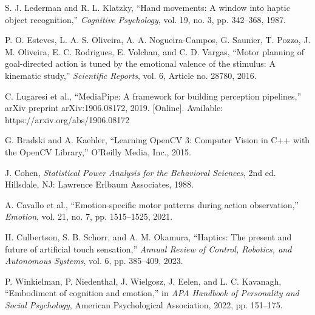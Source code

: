 \documentclass[conference]{IEEEtran}
\begin{document}
\begin{thebibliography}{00}

S. J. Lederman and R. L. Klatzky, 
``Hand movements: A window into haptic object recognition,'' 
\textit{Cognitive Psychology}, vol. 19, no. 3, pp. 342--368, 1987.

P. O. Esteves, L. A. S. Oliveira, A. A. Nogueira-Campos, G. Saunier, T. Pozzo, J. M. Oliveira, E. C. Rodrigues, E. Volchan, and C. D. Vargas, 
``Motor planning of goal-directed action is tuned by the emotional valence of the stimulus: A kinematic study,'' 
\textit{Scientific Reports}, vol. 6, Article no. 28780, 2016.

C. Lugaresi et al., 
``MediaPipe: A framework for building perception pipelines,'' 
arXiv preprint arXiv:1906.08172, 2019. 
[Online]. Available: https://arxiv.org/abs/1906.08172

G. Bradski and A. Kaehler,
``Learning OpenCV 3: Computer Vision in C++ with the OpenCV Library,''
O'Reilly Media, Inc., 2015.

J. Cohen,
\textit{Statistical Power Analysis for the Behavioral Sciences}, 2nd ed.
Hillsdale, NJ: Lawrence Erlbaum Associates, 1988.

A. Cavallo et al.,
``Emotion-specific motor patterns during action observation,''
\textit{Emotion}, vol. 21, no. 7, pp. 1515--1525, 2021.

H. Culbertson, S. B. Schorr, and A. M. Okamura,
``Haptics: The present and future of artificial touch sensation,''
\textit{Annual Review of Control, Robotics, and Autonomous Systems}, vol. 6, pp. 385--409, 2023.

P. Winkielman, P. Niedenthal, J. Wielgosz, J. Eelen, and L. C. Kavanagh,
``Embodiment of cognition and emotion,''
in \textit{APA Handbook of Personality and Social Psychology}, 
American Psychological Association, 2022, pp. 151--175.

\end{thebibliography}
\end{document}
